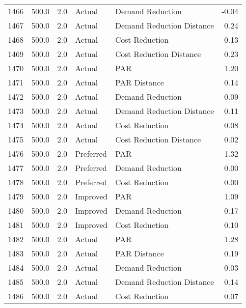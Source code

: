 \begin{longtable}{lrrllr}
1466 &        500.0 &     2.0 &         Actual &           Demand Reduction &  -0.04 \\
1467 &        500.0 &     2.0 &         Actual &  Demand Reduction Distance &   0.24 \\
1468 &        500.0 &     2.0 &         Actual &             Cost Reduction &  -0.13 \\
1469 &        500.0 &     2.0 &         Actual &    Cost Reduction Distance &   0.23 \\
1470 &        500.0 &     2.0 &         Actual &                        PAR &   1.20 \\
1471 &        500.0 &     2.0 &         Actual &               PAR Distance &   0.14 \\
1472 &        500.0 &     2.0 &         Actual &           Demand Reduction &   0.09 \\
1473 &        500.0 &     2.0 &         Actual &  Demand Reduction Distance &   0.11 \\
1474 &        500.0 &     2.0 &         Actual &             Cost Reduction &   0.08 \\
1475 &        500.0 &     2.0 &         Actual &    Cost Reduction Distance &   0.02 \\
1476 &        500.0 &     2.0 &      Preferred &                        PAR &   1.32 \\
1477 &        500.0 &     2.0 &      Preferred &           Demand Reduction &   0.00 \\
1478 &        500.0 &     2.0 &      Preferred &             Cost Reduction &   0.00 \\
1479 &        500.0 &     2.0 &       Improved &                        PAR &   1.09 \\
1480 &        500.0 &     2.0 &       Improved &           Demand Reduction &   0.17 \\
1481 &        500.0 &     2.0 &       Improved &             Cost Reduction &   0.10 \\
1482 &        500.0 &     2.0 &         Actual &                        PAR &   1.28 \\
1483 &        500.0 &     2.0 &         Actual &               PAR Distance &   0.19 \\
1484 &        500.0 &     2.0 &         Actual &           Demand Reduction &   0.03 \\
1485 &        500.0 &     2.0 &         Actual &  Demand Reduction Distance &   0.14 \\
1486 &        500.0 &     2.0 &         Actual &             Cost Reduction &   0.07 \\

\end{longtable}
